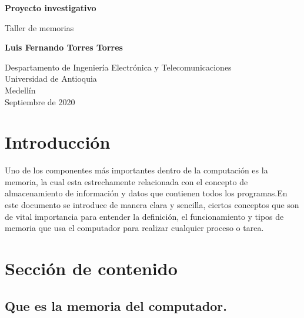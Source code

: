 \documentclass{article}
\begin{document}
\begin{titlepage}
    \begin{center}
        \vspace*{1cm}
            
        \Huge
        \textbf{Proyecto investigativo}
        
            
        \vspace{0.5cm}
        \LARGE
        Taller de memorias
            
        \vspace{1.5cm}
            
        \textbf{Luis Fernando Torres Torres}
            
        \vfill
            
        \vspace{0.8cm}
            
        \Large
        Despartamento de Ingeniería Electrónica y Telecomunicaciones\\
        Universidad de Antioquia\\
        Medellín\\
        Septiembre de 2020
            
    \end{center}
\end{titlepage}

\tableofcontents%

\newpage

\section{Introducción}\label{intro}
Uno de los componentes más importantes dentro de la computación es la memoria, la cual esta estrechamente relacionada con el concepto de almacenamiento de información y datos que contienen todos los programas.En este documento se introduce de manera clara y sencilla, ciertos conceptos que son de vital importancia para entender la definición, el funcionamiento y tipos de memoria que usa el computador para realizar cualquier proceso o tarea.

\section{Sección de contenido}
\subsection{Que es la memoria del computador.} \label{contenido}
\end{document}
